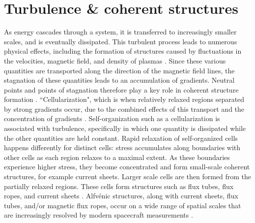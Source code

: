 

\section{Turbulence \& coherent structures}
As energy cascades through a system, it is transferred to increasingly smaller scales, and is eventually dissipated. This turbulent process leads to numerous physical effects, including the formation of structures caused by fluctuations in the velocities, magnetic field, and density of plasmas \citep{Matthaeus:2015}. Since these various quantities are transported along the direction of the magnetic field lines, the stagnation of these quantities leads to an accumulation of gradients. Neutral points and points of stagnation therefore play a key role in coherent structure formation \citep{Matthaeus:2015}. ``Cellularization", which is when relatively relaxed regions separated by strong gradients occur, due to the combined effects of this transport and the concentration of gradients \citep{Matthaeus:2015}. Self-organization such as a cellularization is associated with turbulence, specifically in which one quantity is dissipated while the other quantities are held constant. Rapid relaxation of self-organized cells happens differently for distinct cells: stress accumulates along boundaries with other cells as each region relaxes to a maximal extent. As these boundaries experience higher stress, they become concentrated and form small-scale coherent structures, for example current sheets. Larger scale cells are then formed from the partially relaxed regions. These cells form structures such as flux tubes, flux ropes, and current sheets \citep{Matthaeus:2015}. Alfv\'enic structures, along with current sheets, flux tubes, and/or magnetic flux ropes, occur on a wide range of spatial scales that are increasingly resolved by modern spacecraft measurements \citep{Greco:2018, Pecora:2019, Zheng:2018, Artemyev:2019}.


